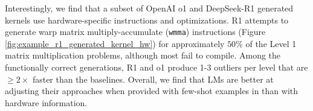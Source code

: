 Interestingly, we find that a subset of OpenAI o1 and DeepSeek-R1 generated kernels use hardware-specific instructions and optimizations. R1 attempts to generate warp matrix multiply-accumulate (\texttt{wmma}) instructions (Figure \ref{fig:example_r1_generated_kernel_hw}) for approximately $50\%$ of the Level 1 matrix multiplication problems, although most fail to compile. Among the functionally correct generations, R1 and o1 produce 1-3 outliers per level that are $\geq 2\times$ faster than the  baselines. Overall, we find that LMs are better at adjusting their approaches when provided with few-shot examples in  than with hardware information.
